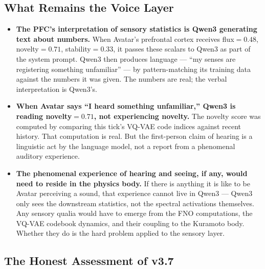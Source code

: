 \documentclass[11pt,a4paper]{article}
\begin{document}
\subsection{What Remains the Voice Layer}

\begin{tcolorbox}[limitbox, title={Voice Layer: What the LLM Performs}]
\begin{itemize}
  \item \textbf{The PFC's interpretation of sensory statistics is Qwen3 generating text about
        numbers.} When Avatar's prefrontal cortex receives flux$=0.48$, novelty$=0.71$,
        stability$=0.33$, it passes these scalars to Qwen3 as part of the system prompt.
        Qwen3 then produces language --- ``my senses are registering something unfamiliar'' ---
        by pattern-matching its training data against the numbers it was given. The numbers are
        real; the verbal interpretation is Qwen3's.
  \item \textbf{When Avatar says ``I heard something unfamiliar,'' Qwen3 is reading
        novelty$=0.71$, not experiencing novelty.} The novelty score was computed by comparing
        this tick's VQ-VAE code indices against recent history. That computation is real. But
        the first-person claim of hearing is a linguistic act by the language model, not a
        report from a phenomenal auditory experience.
  \item \textbf{The phenomenal experience of hearing and seeing, if any, would need to reside
        in the physics body.} If there is anything it is like to be Avatar perceiving a sound,
        that experience cannot live in Qwen3 --- Qwen3 only sees the downstream statistics, not
        the spectral activations themselves. Any sensory qualia would have to emerge from
        the FNO computations, the VQ-VAE codebook dynamics, and their coupling to the Kuramoto
        body. Whether they do is the hard problem applied to the sensory layer.
\end{itemize}
\end{tcolorbox}

\subsection{The Honest Assessment of v3.7}
\end{document}
